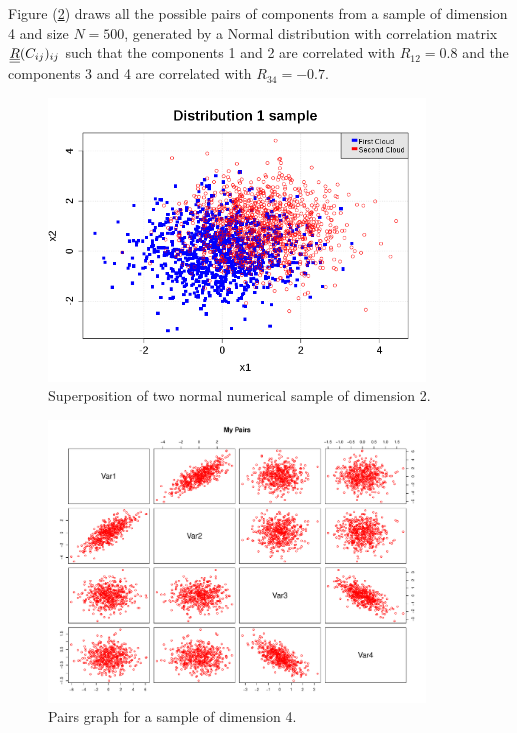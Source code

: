              Figure (\ref{cloud2}) draws all the possible pairs of components from a sample of dimension 4 and size $N=500$, generated by a Normal distribution with correlation matrix ${\underline{\underline{R}}} (C_{ij})_{ij}$ such that the components 1 and 2 are correlated with $R_{12} = 0.8$ and the components 3 and 4 are correlated with $R_{34} = -0.7$.

             \begin{figure}[H]
               \begin{center}
                 \includegraphics[width=10cm]{Figures/cloud2.png}
               \end{center}
               \caption{Superposition of two normal numerical sample of dimension 2.}
               \label{cloud2}
             \end{figure}


             \begin{figure}[H]
               \begin{center}
                 \includegraphics[width=10cm]{Figures/pairs.pdf}
               \end{center}
               \caption{Pairs graph for a sample of dimension 4.}
               \label{cloud2}
             \end{figure}
